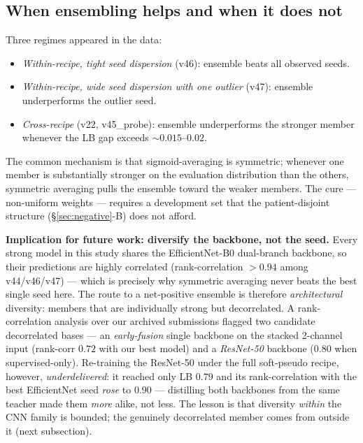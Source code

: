 \documentclass[conference]{IEEEtran}
\begin{document}
\subsection{When ensembling helps and when it does not}

Three regimes appeared in the data:
\begin{itemize}
  \item \emph{Within-recipe, tight seed dispersion} (v46): ensemble beats all observed seeds.
  \item \emph{Within-recipe, wide seed dispersion with one outlier} (v47): ensemble underperforms the outlier seed.
  \item \emph{Cross-recipe} (v22, v45\_probe): ensemble underperforms the stronger member whenever the LB gap exceeds $\sim$$0.015$--$0.02$.
\end{itemize}
The common mechanism is that sigmoid-averaging is symmetric; whenever one member is substantially stronger on the evaluation distribution than the others, symmetric averaging pulls the ensemble toward the weaker members. The cure --- non-uniform weights --- requires a development set that the patient-disjoint structure (\S\ref{sec:negative}-B) does not afford.

\textbf{Implication for future work: diversify the backbone, not the seed.} Every strong model in this study shares the EfficientNet-B0 dual-branch backbone, so their predictions are highly correlated (rank-correlation $>0.94$ among v44/v46/v47) --- which is precisely why symmetric averaging never beats the best single seed here. The route to a net-positive ensemble is therefore \emph{architectural} diversity: members that are individually strong but decorrelated. A rank-correlation analysis over our archived submissions flagged two candidate decorrelated bases --- an \emph{early-fusion} single backbone on the stacked 2-channel input (rank-corr $0.72$ with our best model) and a \emph{ResNet-50} backbone ($0.80$ when supervised-only). Re-training the ResNet-50 under the full soft-pseudo recipe, however, \emph{underdelivered}: it reached only LB $0.79$ and its rank-correlation with the best EfficientNet seed \emph{rose} to $0.90$ --- distilling both backbones from the same teacher made them \emph{more} alike, not less. The lesson is that diversity \emph{within} the CNN family is bounded; the genuinely decorrelated member comes from outside it (next subsection).
\end{document}
